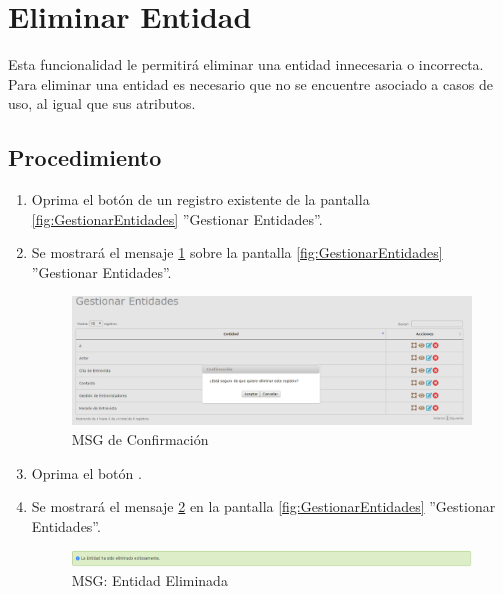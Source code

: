 \hypertarget{cv:eliminarEntidad}{\section{Eliminar Entidad}} \label{sec:eliminarEntidad}

	Esta funcionalidad le permitirá eliminar una entidad innecesaria o incorrecta. Para eliminar una entidad es necesario que no se encuentre asociado a casos de uso, al igual que sus atributos.

		\subsection{Procedimiento}

			\begin{enumerate}
	
			\item Oprima el botón \IUBotonEliminar{} de un registro existente de la pantalla \ref{fig:GestionarEntidades} ''Gestionar Entidades''.
	
			\item Se mostrará el mensaje \ref{fig:confirmaEliminaEntidad} sobre la pantalla \ref{fig:GestionarEntidades} ''Gestionar Entidades''.
			
			\begin{figure}[htbp!]
				\begin{center}
					\includegraphics[scale=0.5]{roles/lider/entidades/pantallas/IU12-3MSG10}
					\caption{MSG de Confirmación}
					\label{fig:confirmaEliminaEntidad}
				\end{center}
			\end{figure}
						
			\item Oprima el botón \IUAceptar.
			
			\item Se mostrará el mensaje \ref{fig:entidadEliminada} en la pantalla \ref{fig:GestionarEntidades} ''Gestionar Entidades''.
			
			\begin{figure}[htbp!]
				\begin{center}
					\includegraphics[scale=0.5]{roles/lider/entidades/pantallas/IU12-3MSG1}
					\caption{MSG: Entidad Eliminada}
					\label{fig:entidadEliminada}
				\end{center}
			\end{figure}
			\end{enumerate}